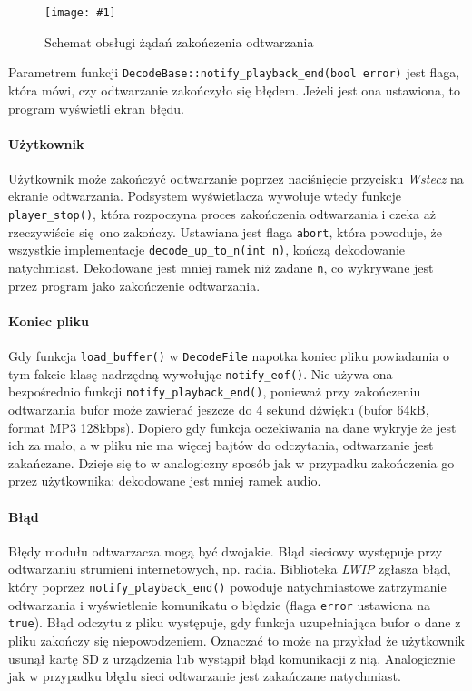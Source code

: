 \documentclass[polish]{aghengthesis}
\newcommand{\imgint}[4]{
	\begin{figure}[{#4}]
		\centering
		\texttt{[image: \#1]}
		\caption{#2}
		\label{#1}
	\end{figure}
}
\newcommand{\imgh}[3]{\imgint{#1}{#2}{#3}{H}}
\begin{document}
			\imgh{3/PicoRadio-stop}{Schemat obsługi żądań zakończenia odtwarzania}{1}
			
			Parametrem funkcji \lstinline|DecodeBase::notify_playback_end(bool error)| jest flaga, która mówi, czy odtwarzanie zakończyło się błędem. Jeżeli jest ona ustawiona, to program wyświetli ekran błędu.
			
			\paragraph{Użytkownik}
				Użytkownik może zakończyć odtwarzanie poprzez naciśnięcie przycisku \textit{Wstecz} na ekranie odtwarzania. Podsystem wyświetlacza wywołuje wtedy funkcje \lstinline|player_stop()|, która rozpoczyna proces zakończenia odtwarzania i czeka aż rzeczywiście się ono zakończy. Ustawiana jest flaga \lstinline|abort|, która powoduje, że wszystkie implementacje \lstinline|decode_up_to_n(int n)|, kończą dekodowanie natychmiast. Dekodowane jest mniej ramek niż zadane \lstinline|n|, co wykrywane jest przez program jako zakończenie odtwarzania.
			
			\paragraph{Koniec pliku}
				Gdy funkcja \lstinline|load_buffer()| w \lstinline|DecodeFile| napotka koniec pliku powiadamia o tym fakcie klasę nadrzędną wywołując \lstinline|notify_eof()|. Nie używa ona bezpośrednio funkcji \lstinline|notify_playback_end()|, ponieważ przy zakończeniu odtwarzania bufor może zawierać jeszcze do 4 sekund dźwięku (bufor 64kB, format MP3 128kbps). Dopiero gdy funkcja oczekiwania na dane wykryje że jest ich za mało, a w pliku nie ma więcej bajtów do odczytania, odtwarzanie jest zakańczane. Dzieje się to w analogiczny sposób jak w przypadku zakończenia go przez użytkownika: dekodowane jest mniej ramek audio.
			
			\paragraph{Błąd}
				Błędy modułu odtwarzacza mogą być dwojakie. Błąd sieciowy występuje przy odtwarzaniu strumieni internetowych, np. radia. Biblioteka \textit{LWIP} zgłasza błąd, który poprzez \lstinline|notify_playback_end()| powoduje natychmiastowe zatrzymanie odtwarzania i wyświetlenie komunikatu o błędzie (flaga \lstinline|error| ustawiona na \lstinline|true|). Błąd odczytu z pliku występuje, gdy funkcja uzupełniająca bufor o dane z pliku zakończy się niepowodzeniem. Oznaczać to może na przykład że użytkownik usunął kartę SD z urządzenia lub wystąpił błąd komunikacji z nią. Analogicznie jak w przypadku błędu sieci odtwarzanie jest zakańczane natychmiast.
			
\end{document}
